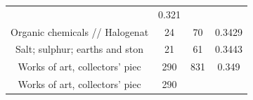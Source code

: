 \documentclass[10pt,]{article}
\begin{document}
\begin{longtable}[]{@{}cccc@{}}
\begin{minipage}[t]{0.20\columnwidth}
\end{minipage} & \begin{minipage}[t]{0.09\columnwidth}\centering\strut
0.321\strut
\end{minipage}\tabularnewline
\begin{minipage}[t]{0.38\columnwidth}\centering\strut
Organic chemicals // Halogenat\strut
\end{minipage} & \begin{minipage}[t]{0.21\columnwidth}\centering\strut
24\strut
\end{minipage} & \begin{minipage}[t]{0.20\columnwidth}\centering\strut
70\strut
\end{minipage} & \begin{minipage}[t]{0.09\columnwidth}\centering\strut
0.3429\strut
\end{minipage}\tabularnewline
\begin{minipage}[t]{0.38\columnwidth}\centering\strut
Salt; sulphur; earths and ston\strut
\end{minipage} & \begin{minipage}[t]{0.21\columnwidth}\centering\strut
21\strut
\end{minipage} & \begin{minipage}[t]{0.20\columnwidth}\centering\strut
61\strut
\end{minipage} & \begin{minipage}[t]{0.09\columnwidth}\centering\strut
0.3443\strut
\end{minipage}\tabularnewline
\begin{minipage}[t]{0.38\columnwidth}\centering\strut
Works of art, collectors' piec\strut
\end{minipage} & \begin{minipage}[t]{0.21\columnwidth}\centering\strut
290\strut
\end{minipage} & \begin{minipage}[t]{0.20\columnwidth}\centering\strut
831\strut
\end{minipage} & \begin{minipage}[t]{0.09\columnwidth}\centering\strut
0.349\strut
\end{minipage}\tabularnewline
\begin{minipage}[t]{0.38\columnwidth}\centering\strut
Works of art, collectors' piec\strut
\end{minipage} & \begin{minipage}[t]{0.21\columnwidth}\centering\strut
290\strut
\end{minipage} & \begin{minipage}[t]{0.20\columnwidth}\centering\strut

\end{minipage}
\end{longtable}
\end{document}
